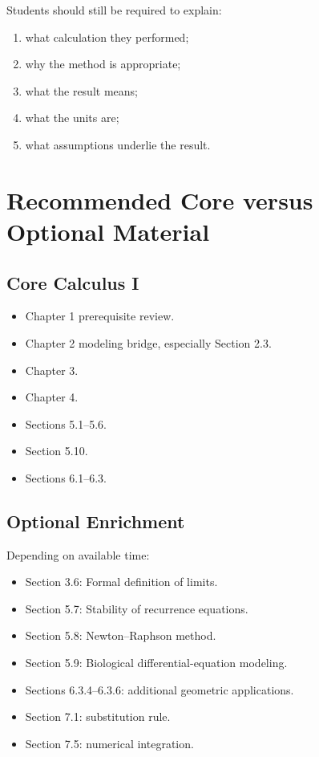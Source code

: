 \documentclass[11pt]{article}
\begin{document}
Students should still be required to explain:

\begin{enumerate}
    \item what calculation they performed;
    \item why the method is appropriate;
    \item what the result means;
    \item what the units are;
    \item what assumptions underlie the result.
\end{enumerate}

\section{Recommended Core versus Optional Material}

\subsection{Core Calculus I}

\begin{itemize}
    \item Chapter 1 prerequisite review.
    \item Chapter 2 modeling bridge, especially Section 2.3.
    \item Chapter 3.
    \item Chapter 4.
    \item Sections 5.1--5.6.
    \item Section 5.10.
    \item Sections 6.1--6.3.
\end{itemize}

\subsection{Optional Enrichment}

Depending on available time:

\begin{itemize}
    \item Section 3.6: Formal definition of limits.
    \item Section 5.7: Stability of recurrence equations.
    \item Section 5.8: Newton--Raphson method.
    \item Section 5.9: Biological differential-equation modeling.
    \item Sections 6.3.4--6.3.6: additional geometric applications.
    \item Section 7.1: substitution rule.
    \item Section 7.5: numerical integration.
\end{itemize}
\end{document}
